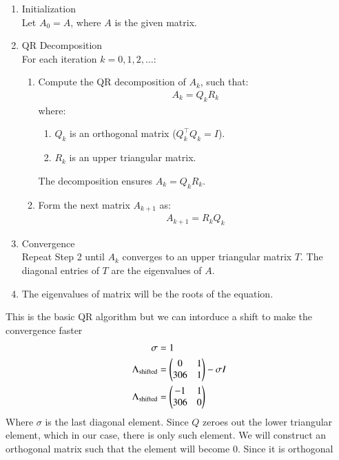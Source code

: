 \documentclass[journal]{IEEEtran}
\begin{document}
\begin{enumerate}
\item Initialization \\
Let $A_0 = A $, where $A$ is the given matrix.

\item QR Decomposition \\
For each iteration $ k = 0, 1, 2, \dots $:
\begin{enumerate}
    \item Compute the QR decomposition of \( A_k \), such that:
    \begin{align}
    A_k = Q_k R_k
    \end{align}
    where:
    \begin{enumerate}
        \item $Q_k $ is an orthogonal matrix ($ Q_k^\top Q_k = I $).
        \item $ R_k $ is an upper triangular matrix.
    \end{enumerate}
    The decomposition ensures $ A_k = Q_k R_k $.

    \item Form the next matrix \( A_{k+1} \) as:
    \begin{align}
    A_{k+1} = R_k Q_k
    \end{align}
\end{enumerate}

\item Convergence\\
Repeat Step 2 until $ A_k $ converges to an upper triangular matrix $ T $. The diagonal entries of $T$ are the eigenvalues of $A$.\\
\item The eigenvalues of matrix will be the roots of the equation.

\end{enumerate}
This is the basic QR algorithm but we can intorduce a shift to make the convergence faster
\begin{align}
\sigma &= 1\\
\Lambda_{\text{shifted}} &= \begin{pmatrix}0 & 1\\306& 1\end{pmatrix} - \sigma I\\
\Lambda_{\text{shifted}} &= \begin{pmatrix}-1 & 1\\ 306 & 0\end{pmatrix}
\end{align}
Where $\sigma$ is the last diagonal element. Since $Q$ zeroes out the lower triangular element, which in our case, there is only such element. We will construct an orthogonal matrix such that the element will become 0. Since it is orthogonal
\end{document}
